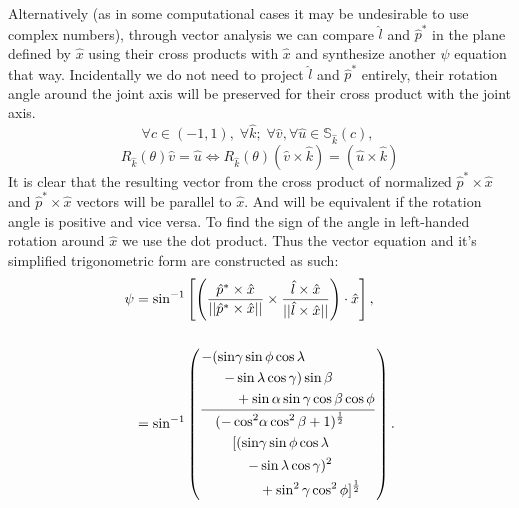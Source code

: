 \documentclass[a4paper,twocolumn,10pt]{article}
\begin{document}
Alternatively (as in some computational cases it may be undesirable to use
complex numbers), through vector analysis we can compare $\hat l$ and $\hat
p^*$ in the plane defined by $\hat x$ using their cross products with $\hat x$ 
and synthesize another $\psi$ equation that way. Incidentally we do not need to
project $\hat l$ and $\hat p^*$ entirely, their rotation angle around the joint
axis will be preserved for their cross product with the joint axis.
\begin{equation}
    \forall c \in (-1, 1),\;
    \forall \hat k;\;
    \forall \hat v, \forall \hat u \in \mathbb{S}_{\hat k}(c),\;
\end{equation}
\begin{equation}
    R_{\hat k}(\theta) \hat v = \hat u \iff
    R_{\hat k}(\theta) ( \hat v \times \hat k) = ( \hat u \times \hat k)
\end{equation}
It is clear that the resulting vector from the cross product of normalized
$\hat p^* \times \hat x$ and $\hat p^* \times \hat x$ vectors will be parallel
to $\hat x$. And will be equivalent if the rotation angle is positive and vice
versa. To find the sign of the angle in left-handed rotation around 
$\hat x$ we use the dot product. Thus the vector equation and it's simplified
trigonometric form are constructed as such:
\begin{equation}
\begin{aligned}
    \psi &= \sin^{-1} 
    \left[ 
        \left(
           \frac{ \hat p^* \times \hat x }{ || \hat p^* \times \hat x || }
           \times
           \frac{ \hat l \times \hat x }{ || \hat l \times \hat x || }
        \right)
        \cdot \hat x
    \right],\\
    \\
    &= \sin^{-1}{\left(
    \vcenter{\hbox{$\displaystyle
    \frac{
        \begin{aligned}
            - (\sin&\gamma \sin\phi \cos\lambda\\
            - &\sin\lambda \cos\gamma) \sin\beta\\
            &+ \sin\alpha \sin\gamma \cos\beta \cos\phi
        \end{aligned}
    }
    {
        \begin{aligned}
            (- \cos^{2}&\alpha \cos^{2}\beta + 1)^{\frac{1}{2}}\\
            [(\sin&\gamma \sin\phi \cos\lambda\\ 
            - &\sin\lambda \cos\gamma)^{2}\\
            &+ \sin^{2}\gamma \cos^{2}\phi]^{\frac{1}{2}}
        \end{aligned}
    }$}}
\right).}
\end{aligned}
\end{equation}
\end{document}
